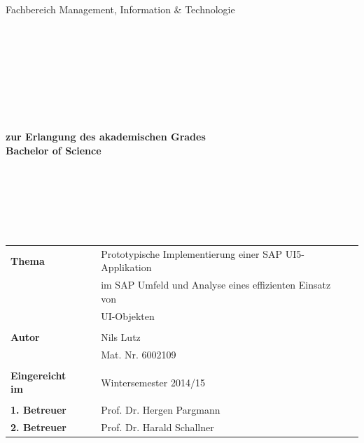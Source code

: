 \begin{center}
\Large{Fachbereich Management, Information \& Technologie}
\end{center}
\begin{verbatim}




\end{verbatim}
\begin{center}
\doublespacing
\textbf{\LARGE{\titleDocument}}\\
\singlespacing
\begin{verbatim}

\end{verbatim}
\end{center}
\begin{verbatim}

\end{verbatim}
\begin{center}

\end{center}
\begin{verbatim}

\end{verbatim}
\begin{center}
\textbf{zur Erlangung des akademischen Grades \\ Bachelor of Science}
\end{center}
\begin{verbatim}






\end{verbatim}
\begin{flushleft}
\begin{tabular}{llll}
\textbf{Thema} & & Prototypische Implementierung einer SAP UI5-Applikation & \\
& & im SAP Umfeld und Analyse eines effizienten Einsatz von & \\
& & UI-Objekten & \\
& & & \\
\textbf{Autor} & & Nils Lutz& \\
& & Mat. Nr. 6002109 & \\
& & & \\
\textbf{Eingereicht im} & & Wintersemester 2014/15 &\\
& & & \\
\textbf{1. Betreuer} & & Prof. Dr. Hergen Pargmann &\\
\textbf{2. Betreuer} & & Prof. Dr. Harald Schallner &\\
\end{tabular}
\end{flushleft}